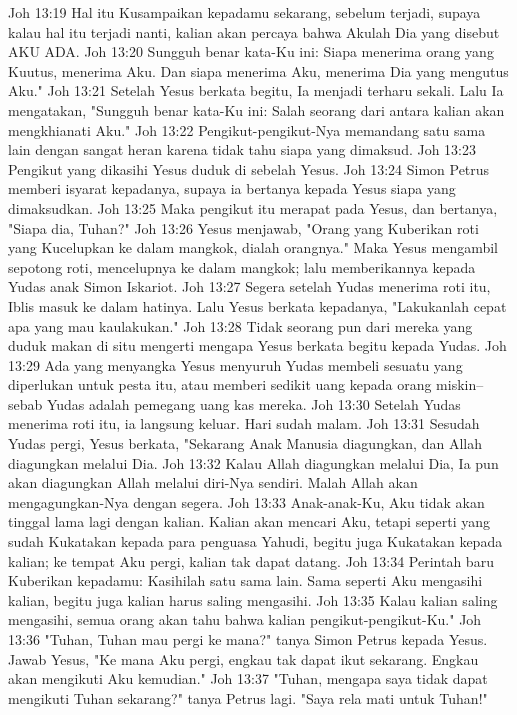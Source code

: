 Joh 13:19  Hal itu Kusampaikan kepadamu sekarang, sebelum terjadi, supaya kalau hal itu terjadi nanti, kalian akan percaya bahwa Akulah Dia yang disebut AKU ADA.
Joh 13:20  Sungguh benar kata-Ku ini: Siapa menerima orang yang Kuutus, menerima Aku. Dan siapa menerima Aku, menerima Dia yang mengutus Aku."
Joh 13:21  Setelah Yesus berkata begitu, Ia menjadi terharu sekali. Lalu Ia mengatakan, "Sungguh benar kata-Ku ini: Salah seorang dari antara kalian akan mengkhianati Aku."
Joh 13:22  Pengikut-pengikut-Nya memandang satu sama lain dengan sangat heran karena tidak tahu siapa yang dimaksud.
Joh 13:23  Pengikut yang dikasihi Yesus duduk di sebelah Yesus.
Joh 13:24  Simon Petrus memberi isyarat kepadanya, supaya ia bertanya kepada Yesus siapa yang dimaksudkan.
Joh 13:25  Maka pengikut itu merapat pada Yesus, dan bertanya, "Siapa dia, Tuhan?"
Joh 13:26  Yesus menjawab, "Orang yang Kuberikan roti yang Kucelupkan ke dalam mangkok, dialah orangnya." Maka Yesus mengambil sepotong roti, mencelupnya ke dalam mangkok; lalu memberikannya kepada Yudas anak Simon Iskariot.
Joh 13:27  Segera setelah Yudas menerima roti itu, Iblis masuk ke dalam hatinya. Lalu Yesus berkata kepadanya, "Lakukanlah cepat apa yang mau kaulakukan."
Joh 13:28  Tidak seorang pun dari mereka yang duduk makan di situ mengerti mengapa Yesus berkata begitu kepada Yudas.
Joh 13:29  Ada yang menyangka Yesus menyuruh Yudas membeli sesuatu yang diperlukan untuk pesta itu, atau memberi sedikit uang kepada orang miskin--sebab Yudas adalah pemegang uang kas mereka.
Joh 13:30  Setelah Yudas menerima roti itu, ia langsung keluar. Hari sudah malam.
Joh 13:31  Sesudah Yudas pergi, Yesus berkata, "Sekarang Anak Manusia diagungkan, dan Allah diagungkan melalui Dia.
Joh 13:32  Kalau Allah diagungkan melalui Dia, Ia pun akan diagungkan Allah melalui diri-Nya sendiri. Malah Allah akan mengagungkan-Nya dengan segera.
Joh 13:33  Anak-anak-Ku, Aku tidak akan tinggal lama lagi dengan kalian. Kalian akan mencari Aku, tetapi seperti yang sudah Kukatakan kepada para penguasa Yahudi, begitu juga Kukatakan kepada kalian; ke tempat Aku pergi, kalian tak dapat datang.
Joh 13:34  Perintah baru Kuberikan kepadamu: Kasihilah satu sama lain. Sama seperti Aku mengasihi kalian, begitu juga kalian harus saling mengasihi.
Joh 13:35  Kalau kalian saling mengasihi, semua orang akan tahu bahwa kalian pengikut-pengikut-Ku."
Joh 13:36  "Tuhan, Tuhan mau pergi ke mana?" tanya Simon Petrus kepada Yesus. Jawab Yesus, "Ke mana Aku pergi, engkau tak dapat ikut sekarang. Engkau akan mengikuti Aku kemudian."
Joh 13:37  "Tuhan, mengapa saya tidak dapat mengikuti Tuhan sekarang?" tanya Petrus lagi. "Saya rela mati untuk Tuhan!"
